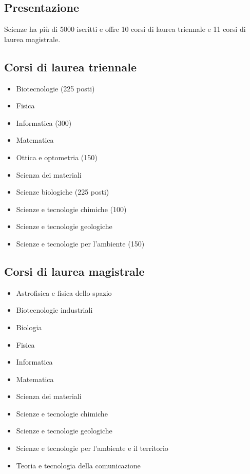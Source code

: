 
\subsection{Presentazione}
Scienze ha più di 5000 iscritti e offre 10 corsi di laurea triennale e 11 corsi di laurea magistrale.

\subsection{Corsi di laurea triennale}
\begin{itemize}
\item Biotecnologie (225 posti) 
\item Fisica 
\item Informatica (300)
\item Matematica 
\item Ottica e optometria (150) 
\item Scienza dei materiali 
\item Scienze biologiche (225 posti) 
\item Scienze e tecnologie chimiche (100) 
\item Scienze e tecnologie geologiche 
\item Scienze e tecnologie per l'ambiente (150)
\end{itemize}

\subsection{Corsi di laurea magistrale}
\begin{itemize}
 \item Astrofisica e fisica dello spazio 
 \item Biotecnologie industriali
 \item Biologia
 \item Fisica
 \item Informatica
 \item Matematica
 \item Scienza dei materiali 
 \item Scienze e tecnologie chimiche 
 \item Scienze e tecnologie geologiche
 \item Scienze e tecnologie per l'ambiente e il territorio 
 \item Teoria e tecnologia della comunicazione
\end{itemize}


